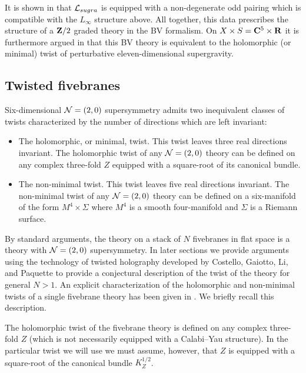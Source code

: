 \parsec[s:rsw]
It is shown in \cite{RSW} that $\mathcal L_{sugra}$ is equipped with a non-degenerate odd pairing which is compatible with the $L_\infty$ structure above. 
All together, this data prescribes the structure of a $\mathbf{Z}/2$ graded theory in the BV formalism. 
On $X \times S = \mathbf{C}^5 \times \mathbf{R}$ it is furthermore argued in \cite{RSW} that this BV theory is equivalent to the holomorphic (or minimal) twist of perturbative eleven-dimensional supergravity. 


\subsection{Twisted fivebranes} 


Six-dimensional $\mathcal N=(2,0)$ supersymmetry admits two inequivalent classes of twists characterized by the number of directions which are left invariant:
\begin{itemize}
\item 
The holomorphic, or minimal, twist. 
This twist leaves three real directions invariant. 
The holomorphic twist of any $\mathcal N=(2,0)$ theory can be defined on any complex three-fold $Z$ equipped with a square-root of its canonical bundle. 
\item 
The non-minimal twist. 
This twist leaves five real directions invariant.
The non-minimal twist of any $\mathcal N=(2,0)$ theory can be defined on a six-manifold of the form $M^4 \times \Sigma$ where $M^4$ is a smooth four-manifold and $\Sigma$ is a Riemann surface. 
\end{itemize}

By standard arguments, the theory on a stack of $N$ fivebranes in flat space is a theory with $\mathcal N=(2,0)$ supersymmetry. 
In later sections we provide arguments using the technology of twisted holography developed by Costello, Gaiotto, Li, and Paquette \cite{??} to provide a conjectural description of the twist of the theory for general $N > 1$. 
An explicit characterization of the holomorphic and non-minimal twists of a single fivebrane theory has been given in \cite{SWtensor}. 
We briefly recall this description. 

\parsec[s:single]

The holomorphic twist of the fivebrane theory is defined on any complex three-fold $Z$ (which is not necessarily equipped with a Calabi--Yau structure).
In the particular twist we will use we must assume, however, that $Z$ is equipped with a square-root of the canonical bundle $K_Z^{1/2}$. 

